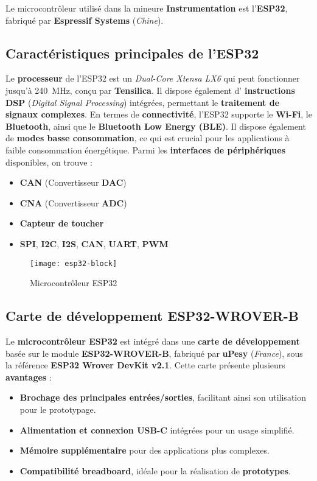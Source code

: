 Le microcontrôleur utilisé dans la mineure \textbf{Instrumentation} est 
l'\textbf{ESP32}, fabriqué par \textbf{Espressif Systems} (\textit{Chine}).

\subsection{Caractéristiques principales de l'ESP32}
Le \textbf{processeur} de l'ESP32 est un \textit{Dual-Core Xtensa LX6} qui peut 
fonctionner jusqu'à \SI{240}{\mega\hertz}, conçu par \textbf{Tensilica}. Il
dispose également d' \textbf{instructions DSP} (\textit{Digital Signal Processing}) 
intégrées, permettant le \textbf{traitement de signaux complexes}. En termes de 
\textbf{connectivité}, l'ESP32 supporte le \textbf{Wi-Fi}, le \textbf{Bluetooth}, 
ainsi que le \textbf{Bluetooth Low Energy (BLE)}. Il dispose également de 
\textbf{modes basse consommation}, ce qui est crucial pour les applications à 
faible consommation énergétique. Parmi les \textbf{interfaces de périphériques} 
disponibles, on trouve :
\begin{itemize}
    \item \textbf{CAN} (Convertisseur \textbf{DAC})
    \item \textbf{CNA} (Convertisseur \textbf{ADC})
    \item \textbf{Capteur de toucher}
    \item \textbf{SPI}, \textbf{I2C}, \textbf{I2S}, \textbf{CAN}, \textbf{UART}, \textbf{PWM}
\end{itemize}

\begin{figure}[!ht]
    \centering
    \texttt{[image: esp32-block]}
    \caption{Microcontrôleur ESP32}
    \label{fig:esp32}
\end{figure}

\subsection{Carte de développement ESP32-WROVER-B}
Le \textbf{microcontrôleur ESP32} est intégré dans une
 \textbf{carte de développement} basée sur le module \textbf{ESP32-WROVER-B}, 
 fabriqué par \textbf{uPesy} (\textit{France}), sous la référence 
 \textbf{ESP32 Wrover DevKit v2.1}. Cette carte présente plusieurs 
 \textbf{avantages} :
\begin{itemize}
    \item \textbf{Brochage des principales entrées/sorties}, facilitant ainsi son utilisation pour le prototypage.
    \item \textbf{Alimentation et connexion USB-C} intégrées pour un usage simplifié.
    \item \textbf{Mémoire supplémentaire} pour des applications plus complexes.
    \item \textbf{Compatibilité breadboard}, idéale pour la réalisation de \textbf{prototypes}.
\end{itemize}